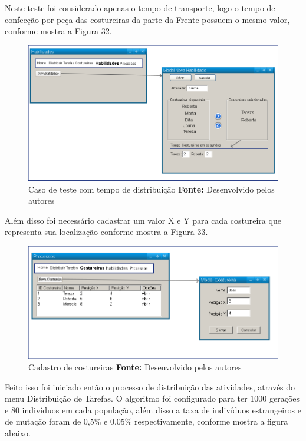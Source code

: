 \par Neste teste foi considerado apenas o tempo de transporte, logo o tempo de confecção por peça das costureiras da parte 
da Frente possuem o mesmo valor, conforme mostra a Figura 32.


\begin{figure}[h!]
	\centerline{\includegraphics[scale=0.3]{./imagens/test_case_2_habilidades.png}}
	\caption[Caso de teste tempo]
	{Caso de teste com tempo de distribuição \textbf{Fonte:} Desenvolvido pelos autores}
	\label{fig:exemplo1}
\end{figure}

\newpage

\par Além disso foi necessário cadastrar um valor X e Y para cada costureira que representa sua localização conforme 
mostra a Figura 33.


\begin{figure}[h!]
	\centerline{\includegraphics[scale=0.3]{./imagens/test_case_2_costureiras.png}}
	\caption[Caso de teste tempo Costureira]
	{Cadastro de costureiras \textbf{Fonte:} Desenvolvido pelos autores}
	\label{fig:exemplo1}
\end{figure}

\par \par Feito isso foi iniciado então o processo de distribuição das atividades, através do menu Distribuição de Tarefas.
O algoritmo foi configurado para ter 1000 gerações e 80 indivíduos em cada população, além disso a taxa de indivíduos
estrangeiros e de mutação foram de 0,5\% e 0,05\% respectivamente, conforme mostra a figura abaixo. 

